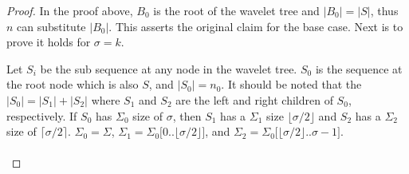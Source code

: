 \documentclass[11pt]{article}
\begin{document}
\begin{proof}
In the proof above, $B_0$ is the root of the wavelet tree and $|B_0| = |S|$, thus $n$ can substitute $|B_0|$. This asserts the original claim for the base case. Next is to prove it holds for $\sigma = k$.

Let $S_i$ be the sub sequence at any node in the wavelet tree. $S_0$ is the sequence at the root node which is also $S$, and $|S_0| = n_0$. It should be noted that the $|S_0| = |S_1| + |S_2|$ where $S_1$ and $S_2$ are the left and right children of $S_0$, respectively. If $S_0$ has $\Sigma_0$ size of $\sigma$, then $S_1$ has a $\Sigma_1$ size $\lfloor \sigma/2 \rfloor$ and $S_2$ has a $\Sigma_2$ size of $\lceil \sigma/2 \rceil$. $\Sigma_0 = \Sigma$, $\Sigma_1 = \Sigma_0\big[0.. \lfloor \sigma/2 \rfloor\big]$, and $\Sigma_2 = \Sigma_0\big[\lfloor \sigma/2 \rfloor .. \sigma-1\big]$. \\
\\


\end{proof}
\end{document}
